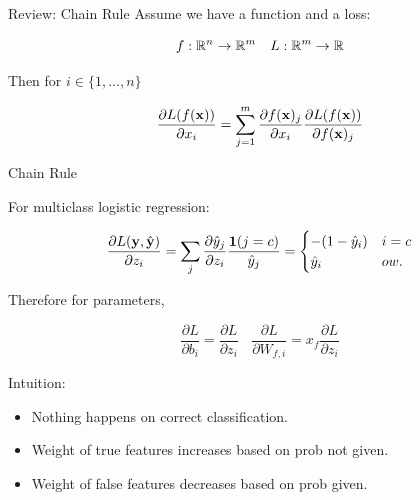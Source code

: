 \documentclass{beamer}
\begin{document}
\begin{frame}{Review: Chain Rule}
  Assume we have a function and a loss:

  \[ f : \reals^n \rightarrow \reals^m \ \ \  L : \reals^m \rightarrow \reals \]

  Then for $i \in \{1, \ldots, n \}$

  \[ \frac{\partial L(f(\mathbf{x}))}{\partial x_i} = \sum_{j =1}^m \frac{\partial f(\mathbf{x})_j} {\partial  x_i} \frac{\partial L(f(\mathbf{x}))} {\partial f(\mathbf{x})_j}   \]


\end{frame}

\begin{frame}{Chain Rule}

  For multiclass logistic regression:

  \[ \frac{\partial L(\mathbf{y}, \hat{\mathbf{y}})}{\partial z_i} = \sum_{j} \frac{\partial \hat{y}_j }{\partial z_i}  \frac{\mathbf{1}(j = c)} {\hat{y}_j} =     \begin{cases}
      -(1 - \hat{y}_i) & i = c\\
      \hat{y}_i & ow. \\
    \end{cases} \]

  Therefore for parameters,

  \[\frac{\partial L}{\partial b_{i}} =
    \frac{\partial L}{\partial z_{i}} \ \ \ \ \frac{\partial L}{\partial W_{f, i}} =
     x_f \frac{\partial L}{\partial z_{i}}\]

   \pause
   Intuition:
   \begin{itemize}
   \item Nothing happens on correct classification.
   \item Weight of true features increases based on prob not given.
   \item Weight of false features decreases based on prob given.
   \end{itemize}
\end{frame}
\end{document}
